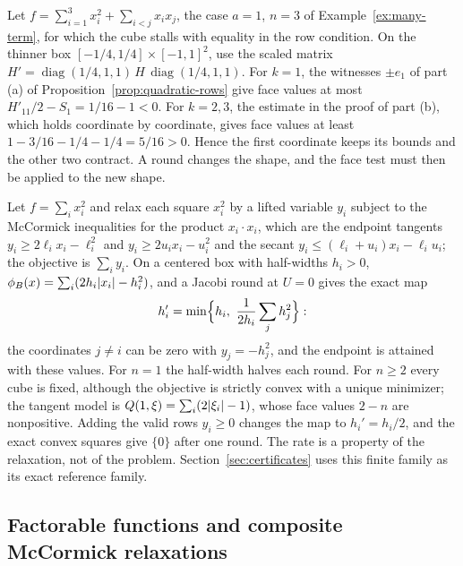 \begin{example}\label{ex:shape-change}
Let $f=\sum_{i=1}^3x_i^2+\sum_{i<j}x_ix_j$, the case $a=1$, $n=3$ of
Example~\ref{ex:many-term}, for which the cube stalls with equality in the
row condition. On the thinner box $[-1/4,1/4]\times[-1,1]^2$, use the scaled
matrix $H'=\operatorname{diag}(1/4,1,1)\,H\,\operatorname{diag}(1/4,1,1)$. For
$k=1$, the witnesses $\pm e_1$ of part (a) of
Proposition~\ref{prop:quadratic-rows} give face values at most
$H'_{11}/2-S_1=1/16-1<0$. For $k=2,3$, the estimate in the proof of part (b),
which holds coordinate by coordinate, gives face values at least
$1-3/16-1/4-1/4=5/16>0$. Hence the first coordinate keeps its bounds and the
other two contract. A round changes the shape, and the face test must then
be applied to the new shape.
\end{example}

\begin{example}\label{ex:finite-square}
Let $f=\sum_ix_i^2$ and relax each square $x_i^2$ by a lifted variable $y_i$
subject to the McCormick inequalities for the product $x_i\cdot x_i$, which
are the endpoint tangents $y_i\ge2\ell_ix_i-\ell_i^2$ and
$y_i\ge2u_ix_i-u_i^2$ and the secant $y_i\le(\ell_i+u_i)x_i-\ell_iu_i$; the
objective is $\sum_iy_i$. On a centered box with half-widths $h_i>0$,
$\phi_B(x)=\sum_i(2h_i\lvert x_i\rvert-h_i^2)$, and a Jacobi round at $U=0$ gives
the exact map
\[
  h_i'=\min\Bigl\{h_i,\ \frac{1}{2h_i}\sum_jh_j^2\Bigr\}:
\]
the coordinates $j\ne i$ can be zero with $y_j=-h_j^2$, and the endpoint is
attained with these values. For $n=1$ the half-width halves each round. For
$n\ge2$ every cube is fixed, although the objective is strictly convex with
a unique minimizer; the tangent model is $Q(1,\xi)=\sum_i(2\lvert \xi_i\rvert-1)$,
whose face values $2-n$ are nonpositive. Adding the valid rows $y_i\ge0$
changes the map to $h_i'=h_i/2$, and the exact convex squares give $\{0\}$
after one round. The rate is a property of the relaxation, not of the
problem. Section~\ref{sec:certificates} uses this finite family as its
exact reference family.
\end{example}

\subsection{Factorable functions and composite McCormick relaxations}\label{sec:local-rates-factorable}

